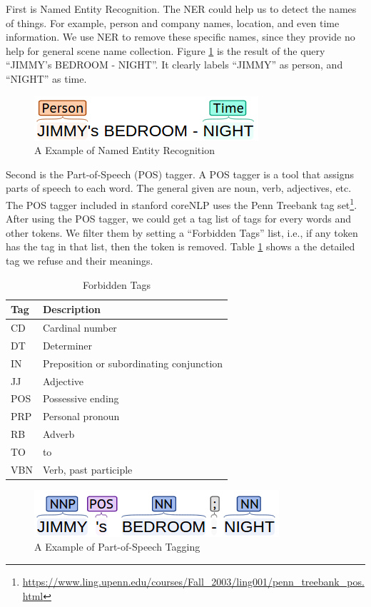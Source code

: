 First is Named Entity Recognition. The NER could help us to detect the names of things. For example, person and company names, location, and even time information. 
We use NER to remove these specific names, since they provide no help for general scene name collection. 
Figure \ref{fig:ner} is the result of the query ``JIMMY's BEDROOM - NIGHT''. 
It clearly labels ``JIMMY'' as person, and ``NIGHT'' as time. 
\begin{figure}[htb]
\centering
\includegraphics[scale=0.6]{figure/dataprep/ner}
\caption{A Example of Named Entity Recognition}
\label{fig:ner}
\end{figure}

Second is the Part-of-Speech (POS) tagger. A POS tagger is a tool that assigns parts of speech to each word. 
The general given are noun, verb, adjectives, etc.  
The POS tagger included in stanford coreNLP uses the Penn Treebank tag set\footnote{\url{https://www.ling.upenn.edu/courses/Fall\_2003/ling001/penn\_treebank\_pos.html}}.  
After using the POS tagger, we could get a tag list of tags for every words and other tokens. 
We filter them by setting a ``Forbidden Tags'' list, i.e., if any token has the tag in that list, then the token is removed.  
Table \ref{tab:forbiddentags} shows a the detailed tag we refuse and their meanings. 

\begin{table}[htb]
\centering
\caption{Forbidden Tags}
\begin{tabular}{ll}
\hline
Tag & Description \\
\hline
CD & Cardinal number\\ 
DT & Determiner\\ 
IN & Preposition or subordinating conjunction\\ 
JJ & Adjective  \\
POS & Possessive ending  \\ 
PRP & Personal pronoun  \\
RB & Adverb\\ 
TO & to \\ 
VBN & Verb, past participle \\ 
\hline
\end{tabular}
\label{tab:forbiddentags}
\end{table}

\begin{figure}[htb]
\centering
\includegraphics[scale=0.6]{figure/dataprep/pos}
\caption{A Example of Part-of-Speech Tagging}
\label{fig:pos}
\end{figure}

